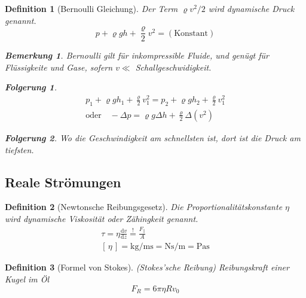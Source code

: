 \documentclass[a4paper, twocolumn]{article}
\numberwithin{equation}{section}
\theoremstyle{hsr-def}
\newtheorem{definition}{Definition}[section]
\theoremstyle{hsr-sub}
\newtheorem{result}{Folgerung}[definition]
\newtheorem{remark}{Bemerkung}[definition]
\newcommand{\dd}[1]{\ensuremath{\mathrm{d}#1}}
\newcommand{\deriv}[2]{\ensuremath{\frac{\dd{#1}}{\dd{#2}}}}
\newcommand{\unitsof}[1]{\ensuremath{\left[\,#1\,\right]}}
\begin{document}
\begin{definition}[Bernoulli Gleichung]
Der Term \(\varrho v^2 / 2\) wird \emph{dynamische Druck} genannt.
\[
    p + \varrho g h + \frac{\varrho}{2} v^2 = (\text{Konstant})
\]

\begin{figure}[h] \centering
    \resizebox{.9\linewidth}{!}{%
    }
\end{figure}

\begin{remark}
Bernoulli gilt f\"ur inkompressible Fluide, und gen\"ugt f\"ur Fl\"ussigkeite und Gase, sofern \(v \ll \) Schallgeschwidigkeit.
\end{remark}

\begin{result}
\begin{gather*}
    p_1 + \varrho g h_1 + \frac{\varrho}{2} v_1^2
    =
    p_2 + \varrho g h_2 + \frac{\varrho}{2} v_1^2
    \\
    \text{oder}\quad -\Delta p = \varrho g \Delta h + \frac{\varrho}{2} \Delta \left( v^2 \right)
\end{gather*}
\end{result}

\begin{result}
Wo die Geschwindigkeit am schnellsten ist, dort ist die Druck am tiefsten.
\end{result}

\end{definition}

\subsection{Reale Str\"omungen}

\begin{definition}[Newtonsche Reibungsgesetz]
Die Proportionalit\"atskonstante \(\eta\) wird \emph{dynamische Viskosit\"at} oder \emph{Z\"ahingkeit} genannt.
\begin{gather*}
    \tau = \eta \deriv{v}{z}
    \stackrel{!}{=} \frac{F_\parallel}{A}  \\
    \unitsof{\eta}  
    = \si{\kilo\gram\per\metre\second}
    = \si{\newton\second\per\metre}
    = \si{\pascal\second}
\end{gather*}
\end{definition}

\begin{definition}[Formel von Stokes]
(Stokes'sche Reibung) Reibungskraft einer Kugel im \"Ol 
\[
    F_R = 6\pi\eta Rv_0
\]
\end{definition}
\end{document}
